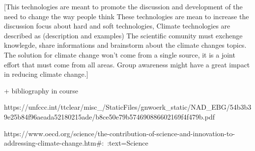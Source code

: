 \documentclass[11pt]{report}
\begin{document}
\begin{mainf}
    



    [This technologies are meant to promote the discussion and development of the need to change the way people think
    These technologies are mean to increase the discussion focus about hard and soft technologies,
    Climate technologies are described as (description and examples)
    The scientific comunity must exchenge knowlegde, share informations and brainstorm about the climate changes topics.
    The solution for climate change won't come from a single source, it is a joint effort that must come from all areas.
    Group awareness might have a great impact in reducing climate change.]


+
bibliography in course 

https://unfccc.int/ttclear/misc_/StaticFiles/gnwoerk_static/NAD_EBG/54b3b39e25b84f96aeada52180215ade/b8ce50e79b574690886602169f4f479b.pdf

https://www.oecd.org/science/the-contribution-of-science-and-innovation-to-addressing-climate-change.htm#:~:text=Science%


\end{mainf}


\begin{bibliof}

\end{bibliof}
\end{document}
